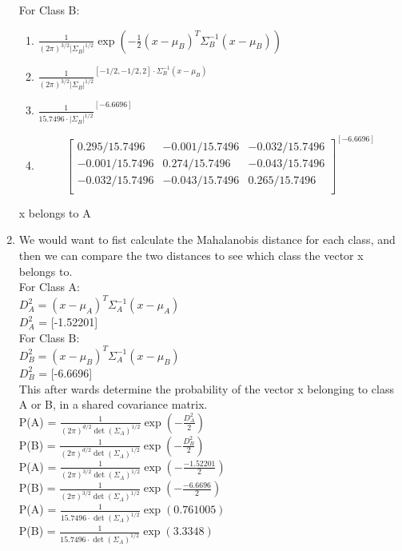 \documentclass{article}
\begin{document}
\begin{enumerate}[label=\alph*)]
For Class B:
\begin{enumerate}[label=\Roman*)]
    \item $\frac{1}{(2 \pi)^{3/2} |\Sigma_B|^{1/2}} \exp \left( -\frac{1}{2} (x-\mu_B)^T \Sigma_B^{-1} (x-\mu_B) \right)$
    \item $\frac{1}{(2 \pi)^{3/2} |\Sigma_B|^{1/2}}^{[-1/2, -1/2, 2] \cdot \Sigma_B^{-1} (x-\mu_B)}$
    \item $\frac{1}{15.7496 \cdot |\Sigma_B|^{1/2}}^{[-6.6696]}$
    \item \[
        \begin{bmatrix}
            0.295/15.7496 & -0.001/15.7496 & -0.032/15.7496 \\
            -0.001/15.7496 & 0.274/15.7496 & -0.043/15.7496 \\
            -0.032/15.7496 & -0.043/15.7496 & 0.265/15.7496 \\
        \end{bmatrix}^{[-6.6696]}   
    \]
\end{enumerate}
x belongs to A
    \item We would want to fist calculate the Mahalanobis distance for each class, and then we can compare the two distances to see which class the vector x belongs to.
    \\ For Class A:
    \\ $D_A^2 = (x - \mu_A)^T \Sigma_A^{-1} (x - \mu_A)$
    \\ $D_A^2$ = [-1.52201]
    \\ For Class B:
    \\ $D_B^2 = (x - \mu_B)^T \Sigma_A^{-1} (x - \mu_B)$
    \\ $D_B^2$ = [-6.6696]
    \\ This after wards determine the probability of the vector x belonging to class A or B, in a shared covariance matrix.
    \\P(A) = $\frac{1}{(2\pi)^{d/2} \det(\Sigma_A)^{1/2}} \exp \left( -\frac{D_A^2}{2} \right)$ 
    \\P(B) = $\frac{1}{(2\pi)^{d/2} \det(\Sigma_A)^{1/2}} \exp \left( -\frac{D_B^2}{2} \right)$
    \\P(A) = $\frac{1}{(2\pi)^{3/2} \det(\Sigma_A)^{1/2}} \exp \left( -\frac{-1.52201}{2} \right)$
    \\P(B) = $\frac{1}{(2\pi)^{3/2} \det(\Sigma_A)^{1/2}} \exp \left( -\frac{-6.6696}{2} \right)$
    \\P(A) = $\frac{1}{15.7496 \cdot \det(\Sigma_A)^{1/2}} \exp \left( 0.761005 \right)$
    \\P(B) = $\frac{1}{15.7496 \cdot \det(\Sigma_A)^{1/2}} \exp \left( 3.3348 \right)$

\end{enumerate}
\end{document}
